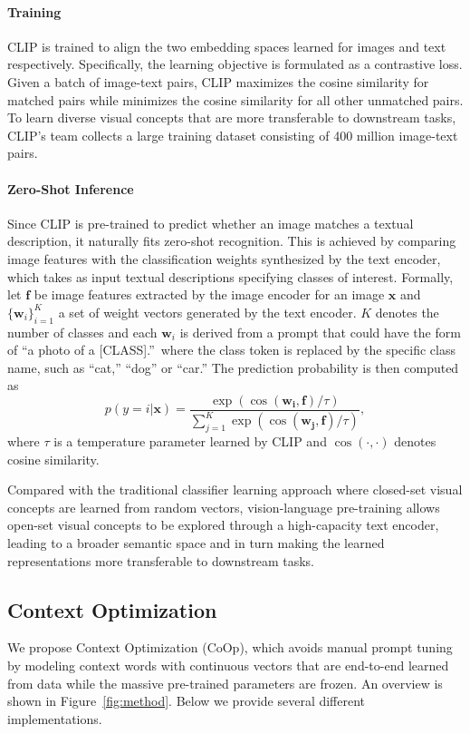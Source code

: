 \paragraph{Training}
CLIP is trained to align the two embedding spaces learned for images and text respectively. Specifically, the learning objective is formulated as a contrastive loss. Given a batch of image-text pairs, CLIP maximizes the cosine similarity for matched pairs while minimizes the cosine similarity for all other unmatched pairs. To learn diverse visual concepts that are more transferable to downstream tasks, CLIP's team collects a large training dataset consisting of 400 million image-text pairs.

\paragraph{Zero-Shot Inference}
Since CLIP is pre-trained to predict whether an image matches a textual description, it naturally fits zero-shot recognition. This is achieved by comparing image features with the classification weights synthesized by the text encoder, which takes as input textual descriptions specifying classes of interest. Formally, let $\bm{f}$ be image features extracted by the image encoder for an image $\bm{x}$ and $\{ \bm{w}_i \}_{i=1}^K$ a set of weight vectors generated by the text encoder. $K$ denotes the number of classes and each $\bm{w}_i$ is derived from a prompt that could have the form of ``a photo of a [CLASS].''~where the class token is replaced by the specific class name, such as ``cat,'' ``dog'' or ``car.'' The prediction probability is then computed as
\begin{equation} \label{eq:prob}
p(y=i|\bm{x}) = \frac{\exp( \cos(\bm{w_i}, \bm{f})/\tau) }{\sum_{j=1}^K \exp( \cos(\bm{w_j}, \bm{f}) /\tau)},
\end{equation}
where $\tau$ is a temperature parameter learned by CLIP and $\cos(\cdot, \cdot)$ denotes cosine similarity.

Compared with the traditional classifier learning approach where closed-set visual concepts are learned from random vectors, vision-language pre-training allows open-set visual concepts to be explored through a high-capacity text encoder, leading to a broader semantic space and in turn making the learned representations more transferable to downstream tasks.


\subsection{Context Optimization}
We propose Context Optimization (CoOp), which avoids manual prompt tuning by modeling context words with continuous vectors that are end-to-end learned from data while the massive pre-trained parameters are frozen. An overview is shown in Figure~\ref{fig:method}. Below we provide several different implementations.


